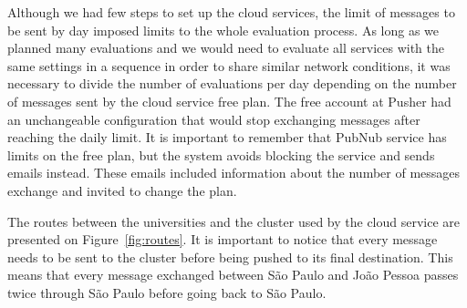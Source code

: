 Although we had few steps to set up the cloud services, the limit of messages to be sent by day imposed limits to the whole evaluation process.
As long as we planned many evaluations and we would need to evaluate all services with the same settings in a sequence in order to share similar network conditions, it was necessary to divide the number of evaluations per day depending on the number of messages sent by the cloud service free plan.
The free account at Pusher had an unchangeable configuration that would stop exchanging messages after reaching the daily limit.
It is important to remember that PubNub service has limits on the free plan, but the system avoids blocking the service and sends emails instead.
These emails included information about the number of messages exchange and invited to change the plan.













The routes between the universities and the cluster used by the cloud service are presented on Figure~\ref{fig:routes}.
It is important to notice that every message needs to be sent to the cluster before being pushed to its final destination.
This means that every message exchanged between S\~{a}o Paulo and Jo\~{a}o Pessoa passes twice through  S\~{a}o Paulo before going back to S\~{a}o Paulo.


